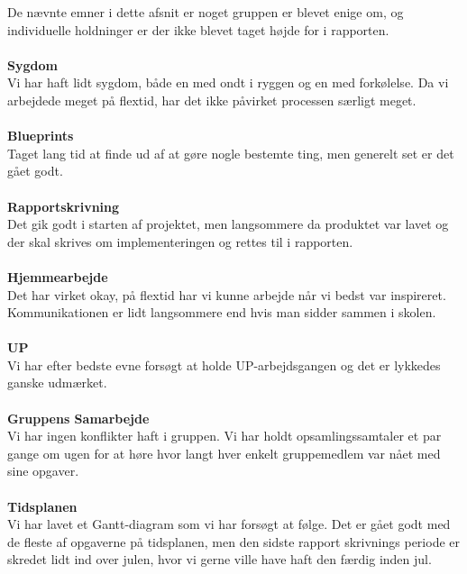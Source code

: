 De nævnte emner i dette afsnit er noget gruppen er blevet enige om, og individuelle holdninger er der ikke blevet taget højde for i rapporten.\\
\\
\textbf{Sygdom}\\
Vi har haft lidt sygdom, både en med ondt i ryggen og en med forkølelse. Da vi arbejdede meget på flextid, har det ikke påvirket processen særligt meget.\\
\\
\textbf{Blueprints}\\
Taget lang tid at finde ud af at gøre nogle bestemte ting, men generelt set er det gået godt.\\
\\
\textbf{Rapportskrivning}\\
Det gik godt i starten af projektet, men langsommere da produktet var lavet og der skal skrives om implementeringen og rettes til i rapporten.\\
\\
\textbf{Hjemmearbejde}\\
Det har virket okay, på flextid har vi kunne arbejde når vi bedst var inspireret. Kommunikationen er lidt langsommere end hvis man sidder sammen i skolen.\\
\\
\textbf{UP}\\
Vi har efter bedste evne forsøgt at holde UP-arbejdsgangen og det er lykkedes ganske udmærket.\\
\\
\textbf{Gruppens Samarbejde}\\
Vi har ingen konflikter haft i gruppen. Vi har holdt opsamlingssamtaler et par gange om ugen for at høre hvor langt hver enkelt gruppemedlem var nået med sine opgaver.\\
\\
\textbf{Tidsplanen}\\
Vi har lavet et Gantt-diagram som vi har forsøgt at følge. Det er gået godt med de fleste af opgaverne på tidsplanen, men den sidste rapport skrivnings periode er skredet lidt ind over julen, hvor vi gerne ville have haft den færdig inden jul.\\
